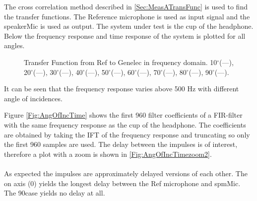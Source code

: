 The cross correlation method described in \autoref{Sec:MeasATransFunc} is used to find the transfer functions. The Reference microphone is used as input signal and the speakerMic is used as output. The system under test is the cup of the headphone. 
Below the frequency response and time response of the system is plotted for all angles. 
\begin{figure}[H]
	
	\caption{Transfer Function from Ref to Genelec in frequency domain. 10$^\circ$(\textcolor{MATLABblue}{---}), 
	20$^\circ$(\textcolor{MATLABorange}{---}), 	
	30$^\circ$(\textcolor{MATLAByellow}{---}), 	
	40$^\circ$(\textcolor{MATLABpurple}{---}), 	
	50$^\circ$(\textcolor{MATLABgreen}{---}), 	
	60$^\circ$(\textcolor{MATLABbabyblue}{---}), 	
	70$^\circ$(\textcolor{MATLABred}{---}), 	
	80$^\circ$(\textcolor{MATLABblue}{---}), 	
	90$^\circ$(\textcolor{MATLABorange}{---}).			
		}
	\label{Fig:AngOfIncFreq}
\end{figure}
It can be seen that the frequency response varies above 500 Hz with different angle of incidences. %


Figure \ref{Fig:AngOfIncTime} shows the first 960 filter coefficients of a FIR-filter with the same frequency response as the cup of the headphone. The coefficients are obtained by taking the IFT of the frequency response and truncating so only the first 960 samples are used.   The delay between the impulses is of interest, therefore a plot with a zoom is shown in \autoref{Fig:AngOfIncTimezoom2}. \\\\
As expected the impulses are approximately delayed versions of each other. The on axis (0\degrees) yields the longest delay between the Ref microphone and spmMic. The 90\degrees case yields no delay at all. 


